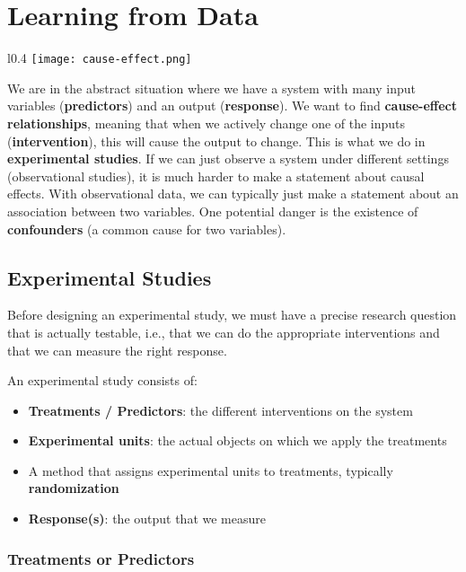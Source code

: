 \section{Learning from Data}

\begin{wrapfigure}[15]{l}{0.4\linewidth}
    \vspace{-15pt}
    \texttt{[image: cause-effect.png]}
\end{wrapfigure}

We are in the abstract situation where we have a system with many input variables (\textbf{predictors}) and an output (\textbf{response}). We want to find \textbf{cause-effect relationships}, meaning that when we actively change one of the inputs (\textbf{intervention}), this will cause the output to change. This is what we do in \textbf{experimental studies}. If we can just observe a system under different settings (observational studies), it is much harder to make a statement about causal effects. With observational data, we can typically just make a statement about an association between two variables. One potential danger is the existence of \textbf{confounders} (a common cause for two variables).


\subsection{Experimental Studies}

Before designing an experimental study, we must have a precise research question that is actually testable, i.e., that we can do the appropriate interventions and that we can measure the right response.\medskip

An experimental study consists of:

\begin{itemize}
	\item \textbf{Treatments / Predictors}: the different interventions on the system
	\item \textbf{Experimental units}: the actual objects on which we apply the treatments
	\item A method that assigns experimental units to treatments, typically \textbf{randomization}
	\item \textbf{Response(s)}: the output that we measure
\end{itemize}

\subsubsection{Treatments or Predictors}

